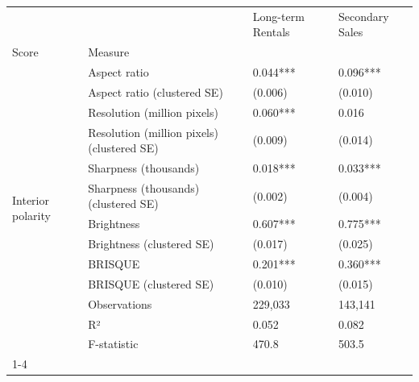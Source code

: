 \begin{tabular}{llll}
\toprule
 &  & Long-term Rentals & Secondary Sales \\
Score & Measure &  &  \\
\midrule
\multirow[t]{13}{*}{Interior polarity} & Aspect ratio & 0.044*** & 0.096*** \\
 & Aspect ratio (clustered SE) & (0.006) & (0.010) \\
 & Resolution (million pixels) & 0.060*** & 0.016 \\
 & Resolution (million pixels) (clustered SE) & (0.009) & (0.014) \\
 & Sharpness (thousands) & 0.018*** & 0.033*** \\
 & Sharpness (thousands) (clustered SE) & (0.002) & (0.004) \\
 & Brightness & 0.607*** & 0.775*** \\
 & Brightness (clustered SE) & (0.017) & (0.025) \\
 & BRISQUE & 0.201*** & 0.360*** \\
 & BRISQUE (clustered SE) & (0.010) & (0.015) \\
 & Observations & 229,033 & 143,141 \\
 & R² & 0.052 & 0.082 \\
 & F-statistic & 470.8 & 503.5 \\
\cline{1-4}
\bottomrule
\end{tabular}
